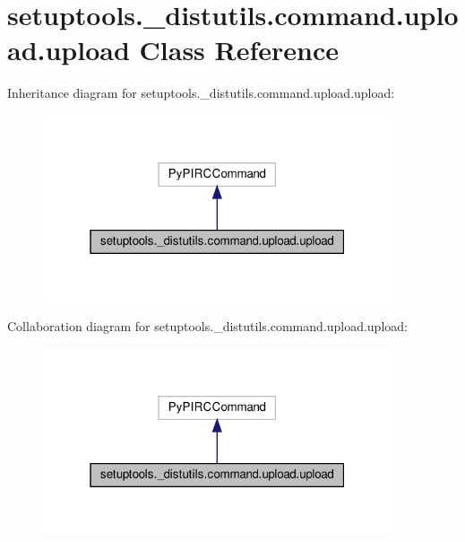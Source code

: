 \hypertarget{classsetuptools_1_1__distutils_1_1command_1_1upload_1_1upload}{}\section{setuptools.\+\_\+distutils.\+command.\+upload.\+upload Class Reference}
\label{classsetuptools_1_1__distutils_1_1command_1_1upload_1_1upload}


Inheritance diagram for setuptools.\+\_\+distutils.\+command.\+upload.\+upload\+:
\nopagebreak
\begin{figure}[H]
\begin{center}
\leavevmode
\includegraphics[width=292pt]{classsetuptools_1_1__distutils_1_1command_1_1upload_1_1upload__inherit__graph}
\end{center}
\end{figure}


Collaboration diagram for setuptools.\+\_\+distutils.\+command.\+upload.\+upload\+:
\nopagebreak
\begin{figure}[H]
\begin{center}
\leavevmode
\includegraphics[width=292pt]{classsetuptools_1_1__distutils_1_1command_1_1upload_1_1upload__coll__graph}
\end{center}
\end{figure}
